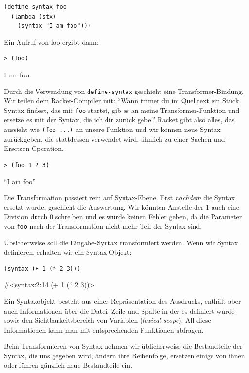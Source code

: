 \begin{lstlisting}
(define-syntax foo
  (lambda (stx)
    (syntax "I am foo")))
\end{lstlisting}

Ein Aufruf von foo ergibt dann:

\begin{lstlisting}
> (foo)
\end{lstlisting}
{\routput {\qq}I am foo{\qq}}

Durch die Verwendung von \texttt{define-syntax} geschieht eine Transformer-Bindung. Wir teilen dem Racket-Compiler mit: ``Wann immer du im Quelltext ein Stück Syntax findest, das mit \texttt{foo} startet, gib es an meine Transformer-Funktion und ersetze es mit der Syntax, die ich dir zurück gebe.'' Racket gibt also alles, das aussieht wie \texttt{(foo ...)} an unsere Funktion und wir können neue Syntax zurückgeben, die stattdessen verwendet wird, ähnlich zu einer Suchen-und-Ersetzen-Operation.

\begin{lstlisting}
> (foo 1 2 3)
\end{lstlisting}
{\routput ``I am foo''}

Die Transformation passiert rein auf Syntax-Ebene. Erst \textit{nachdem} die Syntax ersetzt wurde, geschieht die Auswertung. Wir könnten Anstelle der 1 auch eine Division durch 0 schreiben und es würde keinen Fehler geben, da die Parameter von \texttt{foo} nach der Transformation nicht mehr Teil der Syntax sind.

Übsicherweise soll die Eingabe-Syntax transformiert werden. Wenn wir Syntax definieren, erhalten wir ein Syntax-Objekt:

\begin{lstlisting}
(syntax (+ 1 (* 2 3)))
\end{lstlisting}
{\routput\#<syntax:2:14 (+ 1 (* 2 3))>}

Ein Syntaxobjekt besteht aus einer Repräsentation des Ausdrucks, enthält aber auch Informationen über die Datei, Zeile und Spalte in der es definiert wurde sowie den Sichtbarkeitsbereich von Variablen (\emph{lexical scope}). All diese Informationen kann man mit entsprechenden Funktionen abfragen.

Beim Transformieren von Syntax nehmen wir üblicherweise die Bestandteile der Syntax, die uns gegeben wird, ändern ihre Reihenfolge, ersetzen einige von ihnen oder führen gänzlich neue Bestandteile ein.

